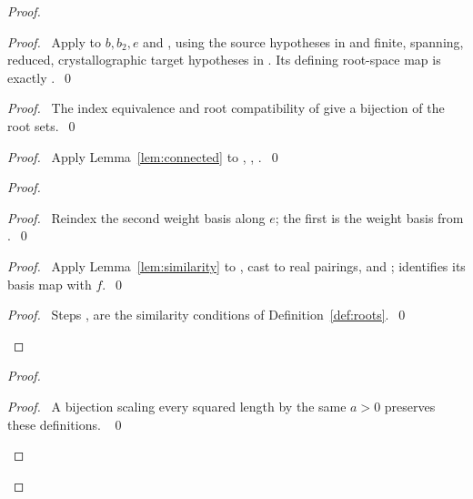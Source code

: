 \begin{proof}
\begin{proof}\pf\ Apply 
to $b,b_2,e$ and , using the source hypotheses in
 and finite, spanning, reduced, crystallographic
target hypotheses in .
Its defining root-space map is exactly .~\qed\end{proof}
\begin{proof}\pf\ The index equivalence and root compatibility of
 give a bijection of the root sets.~\qed\end{proof}
\begin{proof}\pf\ Apply Lemma~\ref{lem:connected} to
, , .~\qed\end{proof}
\begin{proof}
\begin{proof}\pf\ Reindex the second weight basis along $e$;
the first is the weight basis from .~\qed\end{proof}
\begin{proof}\pf\ Apply Lemma~\ref{lem:similarity} to
,  cast to real pairings,
and ;  identifies its basis
map with $f$.~\qed\end{proof}
\qedstep
\begin{proof}\pf\ Steps , 
are the similarity conditions of Definition~\ref{def:roots}.~\qed\end{proof}
\end{proof}
\begin{proof}
\begin{proof}\pf\ A bijection scaling every squared length by the same
$a>0$ preserves these definitions. ~\qed\end{proof}

\end{proof}
\end{proof}
